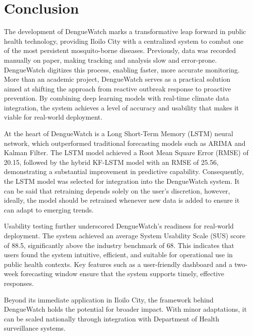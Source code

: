 \chapter{Conclusion}

The development of DengueWatch marks a transformative leap forward in public health technology, providing Iloilo City with a centralized system to combat one of the most persistent mosquito-borne diseases. Previously, data was recorded manually on paper, making tracking and analysis slow and error-prone. DengueWatch digitizes this process, enabling faster, more accurate monitoring. More than an academic project, DengueWatch serves as a practical solution aimed at shifting the approach from reactive outbreak response to proactive prevention. By combining deep learning models with real-time climate data integration, the system achieves a level of accuracy and usability that makes it viable for real-world deployment.

At the heart of DengueWatch is a Long Short-Term Memory (LSTM) neural network, which outperformed traditional forecasting models such as ARIMA and Kalman Filter. The LSTM model achieved a Root Mean Square Error (RMSE) of 20.15, followed by the hybrid KF-LSTM model with an RMSE of 25.56, demonstrating a substantial improvement in predictive capability. Consequently, the LSTM model was selected for integration into the DengueWatch system. It can be said that retraining depends solely on the user's discretion, however, ideally, the model should be retrained whenever new data is added to ensure it can adapt to emerging trends.

Usability testing further underscored DengueWatch’s readiness for real-world deployment. The system achieved an average System Usability Scale (SUS) score of 88.5, significantly above the industry benchmark of 68. This indicates that users found the system intuitive, efficient, and suitable for operational use in public health contexts. Key features such as a user-friendly dashboard and a two-week forecasting window ensure that the system supports timely, effective responses.

Beyond its immediate application in Iloilo City, the framework behind DengueWatch holds the potential for broader impact. With minor adaptations, it can be scaled nationally through integration with Department of Health surveillance systems.

